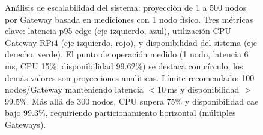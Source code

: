 \begin{figure}[ht]
{%
}%
\caption{An\'{a}lisis de escalabilidad del sistema: proyecci\'{o}n de 1 a 500 nodos por Gateway basada en mediciones con 1 nodo f\'{i}sico. Tres m\'{e}tricas clave: latencia p95 edge (eje izquierdo, azul), utilizaci\'{o}n CPU Gateway RPi4 (eje izquierdo, rojo), y disponibilidad del sistema (eje derecho, verde). El punto de operaci\'{o}n medido (1 nodo, latencia 6\,ms, CPU 15\%, disponibilidad 99.62\%) se destaca con c\'{i}rculo; los dem\'{a}s valores son proyecciones anal\'{i}ticas. L\'{i}mite recomendado: 100 nodos/Gateway manteniendo latencia $<$10\,ms y disponibilidad $>$99.5\%. M\'{a}s all\'{a} de 300 nodos, CPU supera 75\% y disponibilidad cae bajo 99.3\%, requiriendo particionamiento horizontal (m\'{u}ltiples Gateways).}
\label{fig:scalability-chart}
\end{figure}
